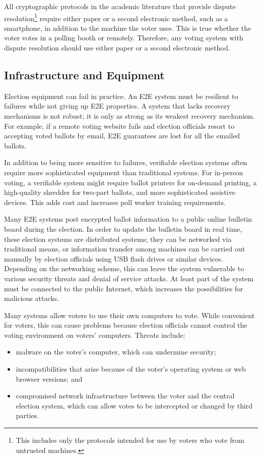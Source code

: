 All cryptographic protocols in the academic literature that provide
dispute resolution\footnote{This includes only the protocols intended
  for use by voters who vote from untrusted machines.}  require either
paper or a second electronic method, such as a smartphone, in addition
to the machine the voter uses. This is true whether the voter votes in
a polling booth or remotely. Therefore, any voting system with dispute
resolution should use either paper or a second electronic method.

\subsection{Infrastructure and Equipment}

Election equipment can fail in practice. An E2E system must be
resilient to failures while not giving up E2E properties. A system
that lacks recovery mechanisms is not robust; it is only as strong as
its weakest recovery mechanism. For example, if a remote voting
website fails and election officials resort to accepting voted ballots
by email, E2E guarantees are lost for all the emailed ballots.

In addition to being more sensitive to failures, verifiable election
systems often require more sophisticated equipment than traditional
systems. For in-person voting, a verifiable system might require
ballot printers for on-demand printing, a high-quality shredder for
two-part ballots, and more sophisticated assistive devices. This adds
cost and increases poll worker training requirements.

Many E2E systems post encrypted ballot information to a public online
bulletin board during the election. In order to update the bulletin
board in real time, these election systems are distributed systems;
they can be networked via traditional means, or information transfer
among machines can be carried out manually by election officials using
USB flash drives or similar devices. Depending on the networking
scheme, this can leave the system vulnerable to various security
threats and denial of service attacks. At least part of the system
must be connected to the public Internet, which increases the
possibilities for malicious attacks.

Many systems allow voters to use their own computers to vote. While
convenient for voters, this can cause problems because election
officials cannot control the voting environment on voters'
computers. Threats include:

\begin{itemize}
\item malware on the voter's computer, which can undermine security;
\item incompatibilities that arise because of the voter's operating
  system or web browser versions; and
\item compromised network infrastructure between the voter and the
  central election system, which can allow votes to be intercepted or
  changed by third parties.
\end{itemize}


